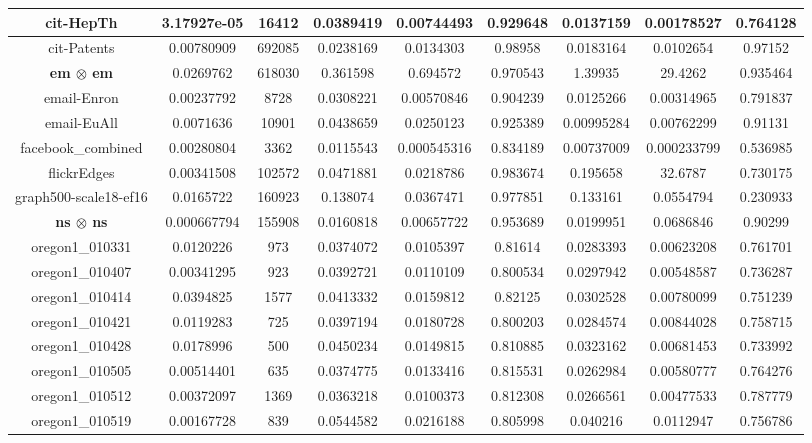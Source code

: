 \documentclass[10]{article}
\begin{document}
\begin{table}
{\begin{tabular}{|c|c|c|c|c|c|c|c|c|}
\hline
cit-HepTh&3.17927e-05 & 16412 & 0.0389419 & 0.00744493 & 0.929648 & 0.0137159 & 0.00178527 & 0.764128 \\
\hline
cit-Patents&0.00780909 & 692085 & 0.0238169 & 0.0134303 & 0.98958 & 0.0183164 & 0.0102654 & 0.97152 \\
\hline
\textbf{em $\boldsymbol{\otimes}$ em}&0.0269762 & 618030 & 0.361598 & 0.694572 & 0.970543 & 1.39935 & 29.4262 & 0.935464 \\
\hline
email-Enron&0.00237792 & 8728 & 0.0308221 & 0.00570846 & 0.904239 & 0.0125266 & 0.00314965 & 0.791837 \\
\hline
email-EuAll&0.0071636 & 10901 & 0.0438659 & 0.0250123 & 0.925389 & 0.00995284 & 0.00762299 & 0.91131 \\
\hline
facebook\_combined&0.00280804 & 3362 & 0.0115543 & 0.000545316 & 0.834189 & 0.00737009 & 0.000233799 & 0.536985 \\
\hline
flickrEdges&0.00341508 & 102572 & 0.0471881 & 0.0218786 & 0.983674 & 0.195658 & 32.6787 & 0.730175 \\
\hline
graph500-scale18-ef16&0.0165722 & 160923 & 0.138074 & 0.0367471 & 0.977851 & 0.133161 & 0.0554794 & 0.230933 \\
\hline
\textbf{ns $\boldsymbol{\otimes}$ ns}&0.000667794 & 155908 & 0.0160818 & 0.00657722 & 0.953689 & 0.0199951 & 0.0686846 & 0.90299 \\
\hline
oregon1\_010331&0.0120226 & 973 & 0.0374072 & 0.0105397 & 0.81614 & 0.0283393 & 0.00623208 & 0.761701 \\
\hline
oregon1\_010407&0.00341295 & 923 & 0.0392721 & 0.0110109 & 0.800534 & 0.0297942 & 0.00548587 & 0.736287 \\
\hline
oregon1\_010414&0.0394825 & 1577 & 0.0413332 & 0.0159812 & 0.82125 & 0.0302528 & 0.00780099 & 0.751239 \\
\hline
oregon1\_010421&0.0119283 & 725 & 0.0397194 & 0.0180728 & 0.800203 & 0.0284574 & 0.00844028 & 0.758715 \\
\hline
oregon1\_010428&0.0178996 & 500 & 0.0450234 & 0.0149815 & 0.810885 & 0.0323162 & 0.00681453 & 0.733992 \\
\hline
oregon1\_010505&0.00514401 & 635 & 0.0374775 & 0.0133416 & 0.815531 & 0.0262984 & 0.00580777 & 0.764276 \\
\hline
oregon1\_010512&0.00372097 & 1369 & 0.0363218 & 0.0100373 & 0.812308 & 0.0266561 & 0.00477533 & 0.787779 \\
\hline
oregon1\_010519&0.00167728 & 839 & 0.0544582 & 0.0216188 & 0.805998 & 0.040216 & 0.0112947 & 0.756786 \\

\end{tabular}}
\end{table}
\end{document}
